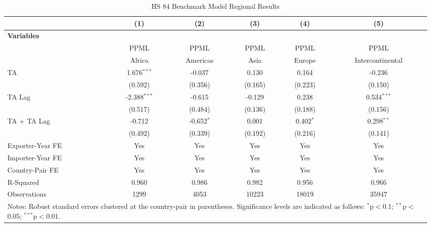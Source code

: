 \begin{table}[htbp]
    \centering
    \caption{HS 84 Benchmark Model Regional Results}
    \label{tab:84_benchmark_region_analysis} %
    \begin{adjustbox}{max width=\textwidth}
    \begin{tabular}{l@{\extracolsep{1pt}}ccccc}
    \hline
    & \multicolumn{1}{c}{(1)} & \multicolumn{1}{c}{(2)} & \multicolumn{1}{c}{(3)} & \multicolumn{1}{c}{(4)} & \multicolumn{1}{c}{(5)} \\
    \hline
    \textbf{Variables} &  &  &  &  &  \\
    \hline
     & PPML & PPML & PPML & PPML & PPML \\
     & Africa & Americas & Asia & Europe & Intercontinental \\
    \hline
    TA & 1.676$^{\ast\ast\ast}$ & -0.037 & 0.130 & 0.164 & -0.236 \\
    & (0.592) & (0.356) & (0.165) & (0.223) & (0.150) \\

    TA Lag & -2.388$^{\ast\ast\ast}$ & -0.615 & -0.129 & 0.238 & 0.534$^{\ast\ast\ast}$ \\
    & (0.517) & (0.484) & (0.136) & (0.188) & (0.156) \\

    TA + TA Lag & -0.712 & -0.652$^{\ast}$ & 0.001 & 0.402$^{\ast}$ & 0.298$^{\ast\ast}$ \\
    & (0.492) & (0.339) & (0.192) & (0.216) & (0.141) \\
    \hline
    Exporter-Year FE & Yes & Yes & Yes & Yes & Yes \\
    Importer-Year FE & Yes & Yes & Yes & Yes & Yes \\
    Country-Pair FE & Yes & Yes & Yes & Yes & Yes \\
    R-Squared & 0.960 & 0.986 & 0.982 & 0.956 & 0.966 \\
    Observations & 1299 & 4053 & 10223 & 18019 & 35947 \\
    \hline
    \multicolumn{6}{l}{\footnotesize{Notes: Robust standard errors clustered at the country-pair in parentheses. Significance levels are indicated as follows: $^{\ast}$p$<$0.1; $^{\ast\ast}$p$<$0.05; $^{\ast\ast\ast}$p$<$0.01.}} \\
    \end{tabular}
    \end{adjustbox}
\end{table}
